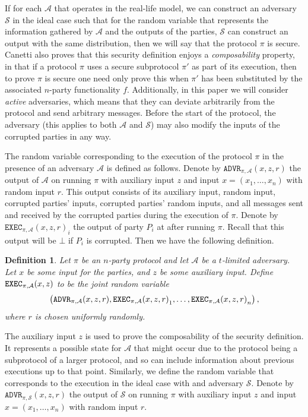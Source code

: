 \documentclass{article}
\newcommand\paper{paper}
\newtheorem{definition}{Definition}
\theoremstyle{remark}
\begin{document}
If for each $\mathcal{A}$ that operates in the real-life model, we can
construct an adversary $\mathcal{S}$ in the ideal case such that for the random
variable that represents the information gathered by $\mathcal{A}$ and the
outputs of the parties, $\mathcal{S}$ can construct an output with the same
distribution, then we will say that the protocol $\pi$ is secure. Canetti also
proves that this security definition enjoys a \textit{composability} property,
in that if a protocol $\pi$ uses a secure subprotocol $\pi'$ as part of its
execution, then to prove $\pi$ is secure one need only prove this when $\pi'$
has been substituted by the associated $n$-party functionality $f$.
Additionally, in this \paper{} we will consider \textit{active} adversaries,
which means that they can deviate arbitrarily from the protocol and send
arbitrary messages. Before the start of the protocol, the adversary (this
applies to both $\mathcal{A}$ and $\mathcal{S}$) may also modify the inputs of
the corrupted parties in any way.

The random variable corresponding to the execution of the protocol $\pi$ in the
presence of an adversary $\mathcal{A}$ is defined as follows. Denote by
$\texttt{ADVR}_{\pi, \mathcal{A}}(x, z, r)$ the output of $\mathcal{A}$ on
running $\pi$ with auxiliary input $z$ and input $x = (x_1, \ldots, x_n)$ with
random input $r$. This output consists of its auxiliary input, random input,
corrupted parties' inputs, corrupted parties' random inputs, and all messages
sent and received by the corrupted parties during the execution of $\pi$.
Denote by ${\texttt{EXEC}_{\pi, \mathcal{A}}(x, z, r)}_i$ the output of party
$P_i$ at after running $\pi$. Recall that this output will be $\bot$ if $P_i$
is corrupted. Then we have the following definition.

\begin{definition}
	Let $\pi$ be an $n$-party protocol and let $\mathcal{A}$ be a $t$-limited
	adversary. Let $x$ be some input for the parties, and $z$ be some auxiliary
	input. Define $\textup{\texttt{EXEC}}_{\pi, \mathcal{A}} (x, z)$ to be the joint random variable
	\begin{align*}
		\left(
			\textup{\texttt{ADVR}}_{\pi, \mathcal{A}}(x, z, r),
			{\textup{\texttt{EXEC}}_{\pi, \mathcal{A}}(x, z, r)}_1,
			\ldots,
			{\textup{\texttt{EXEC}}_{\pi, \mathcal{A}}(x, z, r)}_n
		\right),
	\end{align*}
	where $r$ is chosen uniformly randomly.
\end{definition}

The auxiliary input $z$ is used to prove the composability of the security
definition. It represents a possible state for $\mathcal{A}$ that might occur
due to the protocol being a subprotocol of a larger protocol, and so can
include information about previous executions up to that point. Similarly, we
define the random variable that corresponds to the execution in the ideal case
with and adversary $\mathcal{S}$. Denote by $\texttt{ADVR}_{\pi,
\mathcal{S}}(x, z, r)$ the output of $\mathcal{S}$ on running $\pi$ with
auxiliary input $z$ and input $x = (x_1, \ldots, x_n)$ with random input $r$.
\end{document}
